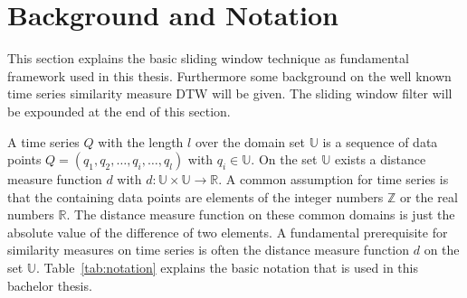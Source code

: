 \section{Background and Notation} \label{background_and_notation}
This section explains the basic sliding window technique as fundamental framework used in this thesis. Furthermore some
background on the well known time series similarity measure DTW will be given. The sliding window filter will be
expounded at the end of this section.

A time series $Q$ with the length $l$ over the domain set $\mathbb{U}$ is a sequence of data points
$Q = (q_1, q_2, \dots, q_i, \dots, q_l)$ with $q_i \in \mathbb{U}$. On the set $\mathbb{U}$ exists a distance measure
function $d$ with $d: \mathbb{U} \times \mathbb{U} \to \mathbb{R}$. A common assumption for time series is that the
containing data points are elements of the integer numbers $\mathbb{Z}$ or the real numbers $\mathbb{R}$. The distance
measure function on these common domains is just the absolute value of the difference of two elements. A fundamental
prerequisite for similarity measures on time series is often the distance measure function $d$ on the set
$\mathbb{U}$. Table~\ref{tab:notation} explains the basic notation that is used in this bachelor thesis.

